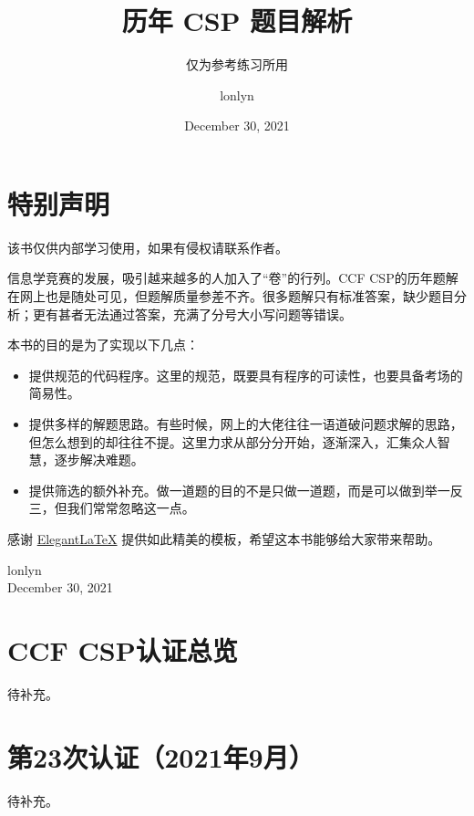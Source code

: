 \documentclass[cn,10pt,math=newtx,citestyle=gb7714-2015,bibstyle=gb7714-2015]{elegantbook}
\title{历年 CSP 题目解析}
\subtitle{仅为参考练习所用}
\author{lonlyn}
\institute{Shanxi University Algorithm Group}
\date{December 30, 2021}
\begin{document}
\maketitle
\frontmatter

\chapter*{特别声明}


该书仅供内部学习使用，如果有侵权请联系作者。

信息学竞赛的发展，吸引越来越多的人加入了“卷”的行列。CCF CSP的历年题解在网上也是随处可见，但题解质量参差不齐。很多题解只有标准答案，缺少题目分析；更有甚者无法通过答案，充满了分号大小写问题等错误。

本书的目的是为了实现以下几点：

\begin{itemize}
  \item 提供规范的代码程序。这里的规范，既要具有程序的可读性，也要具备考场的简易性。
  \item 提供多样的解题思路。有些时候，网上的大佬往往一语道破问题求解的思路，但怎么想到的却往往不提。这里力求从部分分开始，逐渐深入，汇集众人智慧，逐步解决难题。
  \item 提供筛选的额外补充。做一道题的目的不是只做一道题，而是可以做到举一反三，但我们常常忽略这一点。
\end{itemize}

感谢 \href{https://github.com/ElegantLaTeX/ElegantBook}{Elegant\LaTeX{}} 提供如此精美的模板，希望这本书能够给大家带来帮助。

\vskip 1.5cm

\begin{flushright}
lonlyn\\
December 30, 2021
\end{flushright}

\tableofcontents

\mainmatter

\chapter{CCF CSP认证总览}

待补充。

\chapter{第23次认证（2021年9月）}

待补充。
\end{document}
